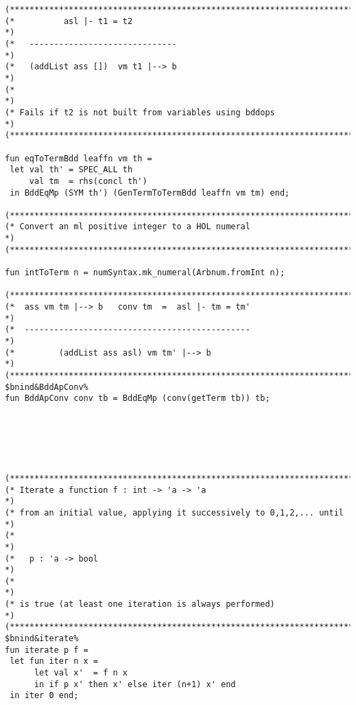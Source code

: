 \documentclass[12pt]{article}
\begin{document}
\begin{footnotesize}
\begin{Verbatim}[commandchars=\$\&\%]
(*****************************************************************************)
(*          asl |- t1 = t2                                                   *)
(*   ------------------------------                                          *)
(*   (addList ass [])  vm t1 |--> b                                          *)
(*                                                                           *)
(* Fails if t2 is not built from variables using bddops                      *)
(*****************************************************************************)

fun eqToTermBdd leaffn vm th =
 let val th' = SPEC_ALL th
     val tm  = rhs(concl th')
 in BddEqMp (SYM th') (GenTermToTermBdd leaffn vm tm) end;

(*****************************************************************************)
(* Convert an ml positive integer to a HOL numeral                           *)
(*****************************************************************************)

fun intToTerm n = numSyntax.mk_numeral(Arbnum.fromInt n);

(*****************************************************************************)
(*  ass vm tm |--> b   conv tm  =  asl |- tm = tm'                           *)
(*  ----------------------------------------------                           *)
(*         (addList ass asl) vm tm' |--> b                                   *)
(*****************************************************************************)
$bnind&BddApConv%
fun BddApConv conv tb = BddEqMp (conv(getTerm tb)) tb;






(*****************************************************************************)
(* Iterate a function f : int -> 'a -> 'a                                    *)
(* from an initial value, applying it successively to 0,1,2,... until        *)
(*                                                                           *)
(*   p : 'a -> bool                                                          *)
(*                                                                           *)
(* is true (at least one iteration is always performed)                      *)
(*****************************************************************************)
$bnind&iterate%
fun iterate p f =
 let fun iter n x =
      let val x'  = f n x
      in if p x' then x' else iter (n+1) x' end
 in iter 0 end;


\end{Verbatim}
\end{footnotesize}
\end{document}
